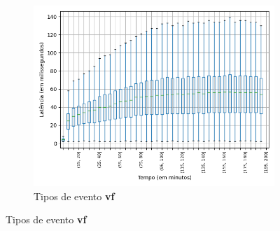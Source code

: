 \begin{figure}
\centering
\begin{subfigure}{.5\textwidth}
\centering
\includegraphics[width=\textwidth]{figuras/graphics/boxplot_8-dez-is_vf.png}
\caption{Tipos de evento \textbf{vf}}
\label{fig:BoxPlot_vf_8-dez-is}
\end{subfigure}%


\end{figure}
